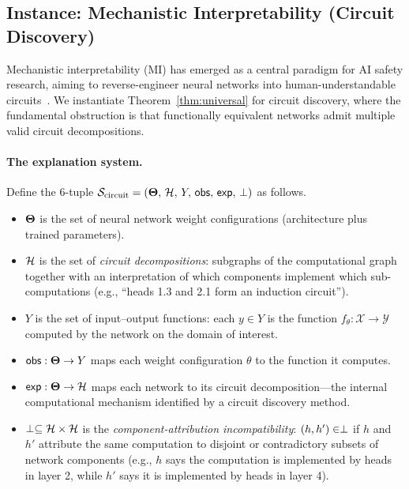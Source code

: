 \subsection{Instance: Mechanistic Interpretability (Circuit Discovery)}
\label{sec:instance-mech-interp}

Mechanistic interpretability (MI) has emerged as a central paradigm for
AI safety research, aiming to reverse-engineer neural networks into
human-understandable circuits~\citep{elhage2022toy,conmy2023automated,anthropic2025circuit}.
We instantiate Theorem~\ref{thm:universal} for circuit discovery, where
the fundamental obstruction is that functionally equivalent networks admit
multiple valid circuit decompositions.

\paragraph{The explanation system.}
Define the 6-tuple $\mathcal{S}_{\mathrm{circuit}} =
(\mathbf{\Theta},\, \mathcal{H},\, Y,\, \mathsf{obs},\, \mathsf{exp},\, \perp)$ as follows.

\begin{itemize}
  \item $\mathbf{\Theta}$ is the set of neural network weight configurations
    (architecture plus trained parameters).
  \item $\mathcal{H}$ is the set of \emph{circuit decompositions}: subgraphs of the
    computational graph together with an interpretation of which components
    implement which sub-computations (e.g., ``heads 1.3 and 2.1 form an
    induction circuit'').
  \item $Y$ is the set of input--output functions: each $y \in Y$ is the
    function $f_\theta : \mathcal{X} \to \mathcal{Y}$ computed by the network
    on the domain of interest.
  \item $\mathsf{obs} : \mathbf{\Theta} \to Y$ maps each weight configuration
    $\theta$ to the function it computes.
  \item $\mathsf{exp} : \mathbf{\Theta} \to \mathcal{H}$ maps each network to its circuit
    decomposition---the internal computational mechanism identified by a
    circuit discovery method.
  \item $\perp \subseteq \mathcal{H} \times \mathcal{H}$ is the \emph{component-attribution
    incompatibility}: $(h, h') \in \perp$ if $h$ and $h'$ attribute the same
    computation to disjoint or contradictory subsets of network components (e.g.,
    $h$ says the computation is implemented by heads in layer 2, while $h'$ says
    it is implemented by heads in layer 4).
\end{itemize}

